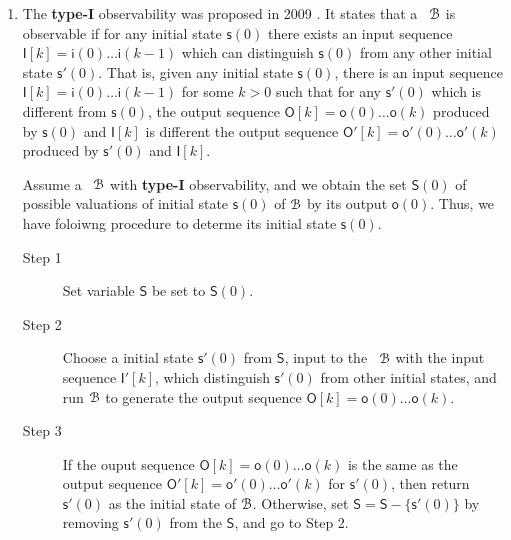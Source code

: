 \begin{enumerate}
\item The  {\bf type-I}  observability was proposed in 2009 \cite{cheng2009controllability}. It states that a \BCN\ ${\mathcal{B}}$ is observable if for any initial state   $\mathsf{s}(0)$ there exists an input sequence  $\mathsf{I}[k]=\mathsf{i}(0)\ldots\mathsf{i}(k-1)$ which can  distinguish $\mathsf{s}(0)$ from any other initial state $\mathsf{s}'(0)$. That is,  given any initial state $\mathsf{s}(0)$, there is an input sequence $\mathsf{I}[k]=\mathsf{i}(0)\ldots\mathsf{i}(k-1)$ for some $k>0$ such that  for any  $\mathsf{s}'(0)$ which is different from $\mathsf{s}(0)$, the output sequence  $\mathsf{O}[k]=\mathsf{o}(0)\ldots\mathsf{o}(k)$ produced by  $\mathsf{s}(0)$ and $\mathsf{I}[k]$ is different the output sequence  $\mathsf{O}'[k]=\mathsf{o}'(0)\ldots \mathsf{o}'(k)$ produced by  $\mathsf{s}'(0)$ and $\mathsf{I}[k]$.

Assume a \BCN\ ${\mathcal{B}}$  with {\bf type-I}  observability, and we obtain the set $\mathsf{S}(0)$ of possible valuations of initial state $\mathsf{s}(0)$ of ${\mathcal{B}}$ by its output $\mathsf{o}(0)$. 
Thus, we have foloiwng procedure to determe its initial state $\mathsf{s}(0)$.
\begin{description}
	\item[Step 1] Set variable $\mathsf{S}$ be set to $\mathsf{S}(0)$.
	\item[Step 2] Choose a initial state $\mathsf{s}'(0)$ from $\mathsf{S}$, input to the \BCN\ ${\mathcal{B}}$ with the input sequence $\mathsf{I}'[k]$, which distinguish $\mathsf{s}'(0)$ from other initial states, and run ${\mathcal{B}}$ to generate the output sequence $\mathsf{O}[k]=\mathsf{o}(0)\ldots\mathsf{o}(k)$.
	\item[Step 3] If the ouput sequence $\mathsf{O}[k]=\mathsf{o}(0)\ldots\mathsf{o}(k)$ is the same as the output sequence $\mathsf{O}'[k]=\mathsf{o}'(0)\ldots\mathsf{o}'(k)$ for $\mathsf{s}'(0)$, then return $\mathsf{s}'(0)$ as the initial state of ${\mathcal{B}}$. Otherwise, set $\mathsf{S}=\mathsf{S}-\{\mathsf{s}'(0)\}$ by removing $\mathsf{s}'(0)$ from the $\mathsf{S}$, and go to Step 2.
	

\end{description}
\end{enumerate}
